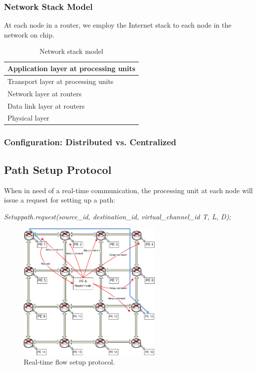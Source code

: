 \documentclass[conference, twocolumn]{IEEEtran}
\theoremstyle{definition}
\begin{document}
\subsubsection{Network Stack Model}
At each node in a router, we employ the Internet stack to each node in the 
network on chip.
\begin{table}[h]
\begin{center}
  \begin{tabular}{ | l | }
    \hline
    Application layer at processing units \\ \hline
    Transport layer at processing units \\ \hline
    Network layer at routers \\ \hline
	Data link layer at routers \\ \hline
	Physical layer \\
    \hline
  \end{tabular}
\end{center}
\caption{Network stack model}
\label{table:NetworkStack}
\end{table}
\subsubsection{Configuration: Distributed vs. Centralized}

\subsection{Path Setup Protocol}
When in need of a real-time communication, the processing unit at each node 
will issue a request for setting up a path:

{\em Setuppath.request(source\_id, destination\_id, virtual\_channel\_id T, L,
D);}

\begin{figure}[htp]
\centering
\includegraphics[width=7cm]{pics/Protocol2}
\caption[Setup request for a real-time flow.]
{Real-time flow setup protocol.}\label{fig:ReqSetup}
\end{figure}
\end{document}
